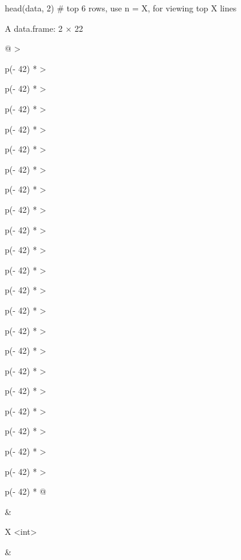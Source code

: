 \documentclass[
  letterpaper,
  DIV=11,
  numbers=noendperiod]{scrreprt}
\newenvironment{Shaded}{\begin{snugshade}}{\end{snugshade}}
\newcommand{\CommentTok}[1]{\textcolor[rgb]{0.37,0.37,0.37}{#1}}
\newcommand{\DecValTok}[1]{\textcolor[rgb]{0.68,0.00,0.00}{#1}}
\newcommand{\FunctionTok}[1]{\textcolor[rgb]{0.28,0.35,0.67}{#1}}
\newcommand{\NormalTok}[1]{\textcolor[rgb]{0.00,0.23,0.31}{#1}}
\begin{document}
\begin{Shaded}
\begin{Highlighting}[]
\FunctionTok{head}\NormalTok{(data, }\DecValTok{2}\NormalTok{) }\CommentTok{\# top 6 rows, use n = X, for viewing top X lines}
\end{Highlighting}
\end{Shaded}

A data.frame: 2 × 22

\begin{longtable}[]{@{}
  >{\raggedright\arraybackslash}p{(\columnwidth - 42\tabcolsep) * }
  >{\raggedright\arraybackslash}p{(\columnwidth - 42\tabcolsep) * }
  >{\raggedright\arraybackslash}p{(\columnwidth - 42\tabcolsep) * }
  >{\raggedright\arraybackslash}p{(\columnwidth - 42\tabcolsep) * }
  >{\raggedright\arraybackslash}p{(\columnwidth - 42\tabcolsep) * }
  >{\raggedright\arraybackslash}p{(\columnwidth - 42\tabcolsep) * }
  >{\raggedright\arraybackslash}p{(\columnwidth - 42\tabcolsep) * }
  >{\raggedright\arraybackslash}p{(\columnwidth - 42\tabcolsep) * }
  >{\raggedright\arraybackslash}p{(\columnwidth - 42\tabcolsep) * }
  >{\raggedright\arraybackslash}p{(\columnwidth - 42\tabcolsep) * }
  >{\raggedright\arraybackslash}p{(\columnwidth - 42\tabcolsep) * }
  >{\raggedright\arraybackslash}p{(\columnwidth - 42\tabcolsep) * }
  >{\raggedright\arraybackslash}p{(\columnwidth - 42\tabcolsep) * }
  >{\raggedright\arraybackslash}p{(\columnwidth - 42\tabcolsep) * }
  >{\raggedright\arraybackslash}p{(\columnwidth - 42\tabcolsep) * }
  >{\raggedright\arraybackslash}p{(\columnwidth - 42\tabcolsep) * }
  >{\raggedright\arraybackslash}p{(\columnwidth - 42\tabcolsep) * }
  >{\raggedright\arraybackslash}p{(\columnwidth - 42\tabcolsep) * }
  >{\raggedright\arraybackslash}p{(\columnwidth - 42\tabcolsep) * }
  >{\raggedright\arraybackslash}p{(\columnwidth - 42\tabcolsep) * }
  >{\raggedright\arraybackslash}p{(\columnwidth - 42\tabcolsep) * }
  >{\raggedright\arraybackslash}p{(\columnwidth - 42\tabcolsep) * }@{}}
\toprule\noalign{}
\begin{minipage}[b]{\linewidth}\raggedright
\end{minipage} & \begin{minipage}[b]{\linewidth}\raggedright
X \textless int\textgreater{}
\end{minipage} & \begin{minipage}[b]{\linewidth}\raggedright

\end{minipage}
\end{longtable}
\end{document}
